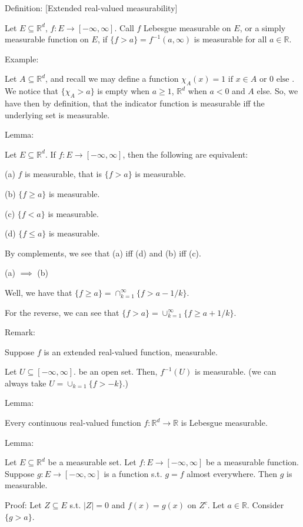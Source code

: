 \documentclass[10pt]{article}
\begin{document}
Definition: [Extended real-valued measurability]

Let $E \subseteq \mathbb{R}^d$, $f: E \to [-\infty,\infty]$. Call $f$ Lebesgue measurable on $E$, or a simply measurable function on $E$, if $\{ f > a \} = f^{-1}(a,\infty) $ is measurable for all $a \in \mathbb{R}$.

Example:

Let $A \subseteq \mathbb{R}^d$, and recall we may define a function $\chi_A(x) = 1 \text{ if } x \in A \text{ or } 0 \text { else }$. We notice that $\{ \chi_A > a \}$ is empty when $a \geq 1$, $\mathbb{R}^d$ when $a < 0$ and $A$ else. So, we have then by definition, that the indicator function is measurable iff the underlying set is measurable.

Lemma:

Let $E \subseteq \mathbb{R}^d$. If $f: E \to [-\infty,\infty]$, then the following are equivalent:

(a) $f$ is measurable, that is $\{ f > a \}$ is measurable.

(b) $\{ f \geq a \}$ is measurable.

(c) $\{ f < a \}$ is measurable.

(d) $\{ f \leq a \}$ is measurable.

By complements, we see that (a) iff (d) and (b) iff (c).

(a) $\implies$ (b)

Well, we have that $\{ f \geq a \} = \cap_{k=1}^\infty \{ f > a  - 1/k \}$.

For the reverse, we can see that $\{ f > a \} = \cup_{k=1}^\infty \{ f \geq a + 1/k \}$.

Remark:

Suppose $f$ is an extended real-valued function, measurable.

Let $U \subseteq [-\infty,\infty]$. be an open set. Then, $f^{-1}(U)$ is measurable. (we can always take $U = \cup_{k=1} \{ f > -k \}$.)

Lemma: 

Every continuous real-valued function $f: \mathbb{R}^d \to \mathbb{R}$ is Lebesgue measurable.

Lemma:

Let $E \subseteq \mathbb{R}^d$ be a measurable set. Let $f: E \to [-\infty,\infty]$ be a measurable function. Suppose $g: E \to [-\infty,\infty]$ is a function s.t. $g = f$ almost everywhere. Then $g$ is measurable. 

Proof: Let $Z \subseteq E$ s.t. $|Z| = 0$ and $f(x) = g(x)$ on $Z^c$. Let $a \in \mathbb{R}$. Consider $\{ g > a \}$. 
\end{document}
